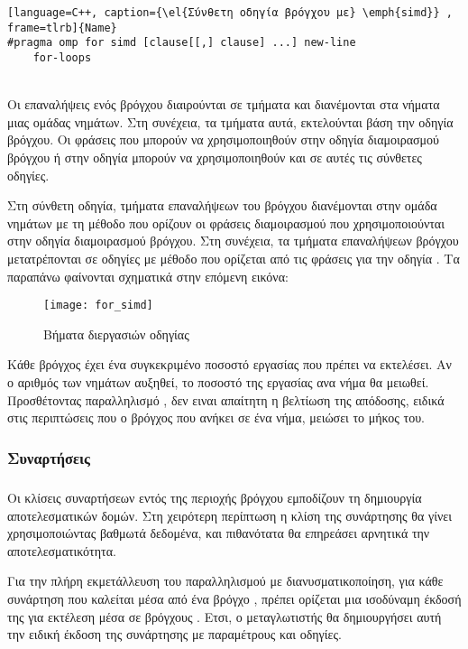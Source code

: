 \begin{lstlisting}[language=C++, caption={\el{Σύνθετη οδηγία βρόγχου με} \emph{simd}} , frame=tlrb]{Name}
#pragma omp for simd [clause[[,] clause] ...] new-line
	for-loops
\end{lstlisting}

\ \\
Οι επαναλήψεις ενός βρόγχου διαιρούνται σε τμήματα και διανέμονται στα νήματα μιας ομάδας νημάτων. Στη συνέχεια, τα
τμήματα αυτά, εκτελούνται βάση την οδηγία \emph{} βρόγχου. Οι φράσεις που μπορούν να χρησιμοποιηθούν στην
οδηγία διαμοιρασμού βρόγχου ή στην οδηγία \emph{} μπορούν να χρησιμοποιηθούν και σε αυτές τις σύνθετες οδηγίες.

Στη σύνθετη οδηγία, τμήματα επαναλήψεων του βρόγχου διανέμονται στην ομάδα νημάτων με τη μέθοδο που ορίζουν οι φράσεις
διαμοιρασμού που χρησιμοποιούνται στην οδηγία διαμοιρασμού βρόγχου. Στη συνέχεια, τα τμήματα επαναλήψεων βρόγχου
μετατρέπονται σε οδηγίες \emph{} με μέθοδο που ορίζεται από τις φράσεις για την οδηγία \emph{}. Τα
παραπάνω φαίνονται σχηματικά στην επόμενη εικόνα:
\ \\
\begin{figure}[h]
\texttt{[image: for\_simd]}
\centering
\captionsetup{justification=centering, singlelinecheck=false}
	\caption{ Βήματα διεργασιών οδηγίας \emph{}}
\label{fig:for_simd}
\end{figure}

Κάθε βρόγχος έχει ένα συγκεκριμένο ποσοστό εργασίας που πρέπει να εκτελέσει. Αν ο αριθμός των νημάτων αυξηθεί, το
ποσοστό της εργασίας ανα νήμα θα μειωθεί. Προσθέτοντας παραλληλισμό \emph{}, δεν ειναι απαίτητη η βελτίωση της
απόδοσης, ειδικά στις περιπτώσεις που ο \emph{} βρόγχος που ανήκει σε ένα νήμα, μειώσει το μήκος του.
\clearpage{}

\subsubsection{Συναρτήσεις \emph{}}
\subparagraph{}
Οι κλίσεις συναρτήσεων εντός της περιοχής βρόγχου \emph{} εμποδίζουν τη δημιουργία αποτελεσματικών
\emph{} δομών. Στη χειρότερη περίπτωση η κλίση της συνάρτησης θα γίνει χρησιμοποιώντας βαθμωτά δεδομένα, και
πιθανότατα θα επηρεάσει αρνητικά την αποτελεσματικότητα.

Για την πλήρη εκμετάλλευση του παραλληλισμού με διανυσματικοποίηση, για κάθε συνάρτηση που καλείται μέσα από ένα βρόγχο
\emph{}, πρέπει ορίζεται μια ισοδύναμη έκδοσή της για εκτέλεση μέσα σε βρόγχους \emph{}. Ετσι, ο
μεταγλωτιστής θα δημιουργήσει αυτή την ειδική έκδοση της συνάρτησης με \emph{} παραμέτρους και οδηγίες.

